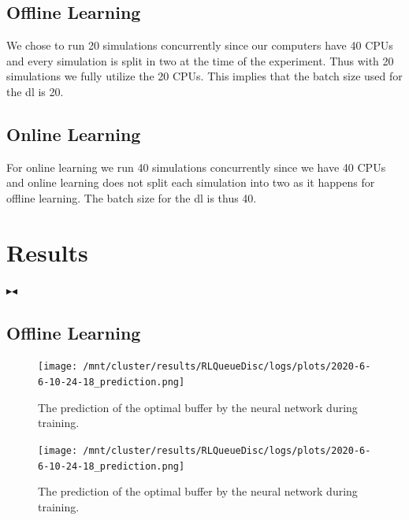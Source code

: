 \documentclass[10pt,sigconf,letterpaper,anonymous]{acmart}
\newcommand{\mynote}[3]{
    \fbox{\bfseries\sffamily\scriptsize#1}
    {\small$\blacktriangleright$\textsf{\emph{\color{#3}{#2}}}$\blacktriangleleft$}}
\newcommand{\todo}[1]{\mynote{TODO}{#1}{red}}
\begin{document}
\subsection{Offline Learning}

We chose to run 20 simulations concurrently since our computers have 40 CPUs and every simulation is split in two at the time of the experiment. Thus with 20 simulations we fully utilize the 20 CPUs. This implies that the batch size used for the \gls{dl} is 20. 

\subsection{Online Learning}

For online learning we run 40 simulations concurrently since we have 40 CPUs and online learning does not split each simulation into two as it happens for offline learning. The batch size for the \gls{dl} is thus 40. 

\section{Results}

\todo{Include vectorized figures instead of rasterized ones. Include axes labels.}

\subsection{Offline Learning}

\begin{figure}[h]
\texttt{[image: /mnt/cluster/results/RLQueueDisc/logs/plots/2020-6-6-10-24-18\_prediction.png]}
\caption{The prediction of the optimal buffer by the neural network during training.}
\label{fig:offlineTraining}
\end{figure}
\begin{figure}[h]
\texttt{[image: /mnt/cluster/results/RLQueueDisc/logs/plots/2020-6-6-10-24-18\_prediction.png]}
\caption{The prediction of the optimal buffer by the neural network during training.}
\label{fig:offlineTraining}
\end{figure}
\end{document}
